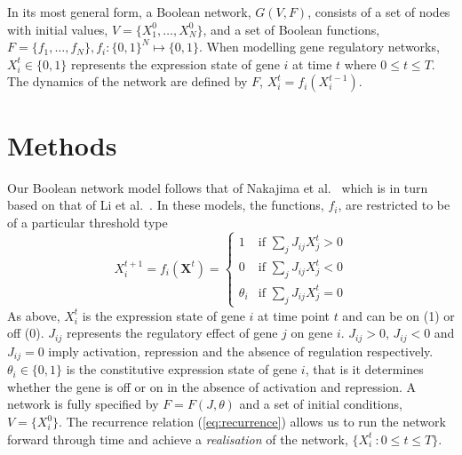 \documentclass{article}
\begin{document}
In its most general form, a Boolean network, \(G(V, F)\), consists of a set of nodes with initial values, \(V = \{X_1^0,\dots,X_N^0\}\), and a set of Boolean functions, \(F = \{f_1,\dots,f_N\}, f_i : \{0, 1\}^N \mapsto \{0, 1\}\). When modelling gene regulatory networks, \(X_i^t \in \{0, 1\}\) represents the expression state of gene \(i\) at time \(t\) where \(0 \le t \le T\). The dynamics of the network are defined by \(F\), \(X_i^t = f_i(X_i^{t-1})\).



\section{Methods}
Our Boolean network model follows that of Nakajima et al.~\cite{Nakajima2010} which is in turn based on that of Li et al.~\cite{Li2004}. In these models, the functions, \(f_i\), are restricted to be of a particular threshold type
\begin{equation}
X_i^{t+1} = f_i(\mathbf{X}^t) = \left\{ \begin{array}{cl}
  1 & \textrm{if $\sum_j J_{ij} X_j^t > 0$} \\
  0 & \textrm{if $\sum_j J_{ij} X_j^t < 0$} \\
  \theta_i & \textrm{if $\sum_j J_{ij} X_j^t = 0$}
\end{array} \right.
\label{eq:recurrence}
\end{equation}
As above, $X_i^t$ is the expression state of gene $i$ at time point $t$ and can be on (1) or off (0). $J_{ij}$ represents the regulatory effect of gene $j$ on gene $i$. $J_{ij} > 0$, $J_{ij} < 0$ and $J_{ij} = 0$  imply activation, repression and the absence of regulation respectively. $\theta_i \in \{0,1\}$ is the constitutive expression state of gene $i$, that is it determines whether the gene is off or on in the absence of activation and repression. A network is fully specified by \(F = F(J, \theta)\) and a set of initial conditions, $V = \{X_i^0\}$. The recurrence relation (\ref{eq:recurrence}) allows us to run the network forward through time and achieve a \emph{realisation} of the network, $\{X_i^t\ : 0 \le t \le T\}$.
\end{document}
